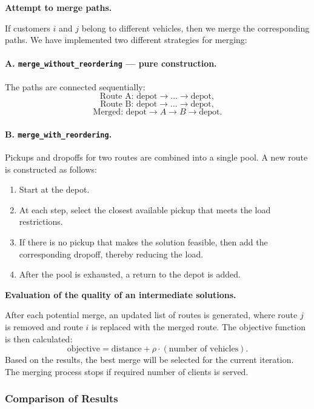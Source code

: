\documentclass[12pt]{article}
\begin{document}
\vspace{0.6em}
\textbf{Attempt to merge paths.}

If customers $i$ and $j$ belong to different vehicles, then we merge the corresponding paths. We have implemented two different strategies for merging:

\paragraph{A. \texttt{merge\_without\_reordering} — pure construction.}

The paths are connected sequentially:
\[
    \text{Route A: depot} \rightarrow \dots \rightarrow \text{depot},
\]
\[
    \text{Route B: depot} \rightarrow \dots \rightarrow \text{depot},
\]
\[
    \text{Merged: depot} \rightarrow A \rightarrow B \rightarrow \text{depot}.
\]

\paragraph{B. \texttt{merge\_with\_reordering}.}

Pickups and dropoffs for two routes are combined into a single pool. A new route is constructed as follows:

\begin{enumerate}
\item Start at the depot.
\item At each step, select the closest available pickup that meets the load restrictions.
\item If there is no pickup that makes the solution feasible, then add the corresponding dropoff, thereby reducing the load.
\item After the pool is exhausted, a return to the depot is added.
\end{enumerate}

\vspace{0.6em}
\textbf{Evaluation of the quality of an intermediate solutions.}

After each potential merge, an updated list of routes is generated, where route $j$ is removed and route $i$ is replaced with the merged route. The objective function is then calculated:
\[
\text{objective} = \text{distance} + \rho \cdot (\text{number of vehicles}).
\]
Based on the results, the best merge will be selected for the current iteration.
The merging process stops if required number of clients is served.

\subsubsection{Comparison of Results}
\end{document}
